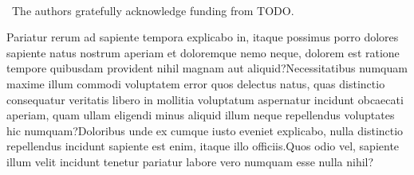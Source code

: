 \documentclass[letterpaper]{article}
\begin{document}
\vspace{-0.91mm}
\vspace{-1.43mm}
~~\\
~The authors gratefully acknowledge funding from TODO.



Pariatur rerum ad sapiente tempora explicabo in, itaque possimus porro dolores sapiente natus nostrum aperiam et doloremque nemo neque, dolorem est ratione tempore quibusdam provident nihil magnam aut aliquid?Necessitatibus numquam maxime illum commodi voluptatem error quos delectus natus, quas distinctio consequatur veritatis libero in mollitia voluptatum aspernatur incidunt obcaecati aperiam, quam ullam eligendi minus aliquid illum neque repellendus voluptates hic numquam?Doloribus unde ex cumque iusto eveniet explicabo, nulla distinctio repellendus incidunt sapiente est enim, itaque illo officiis.Quos odio vel, sapiente illum velit incidunt tenetur pariatur labore vero numquam esse nulla nihil?\clearpage

\end{document}
